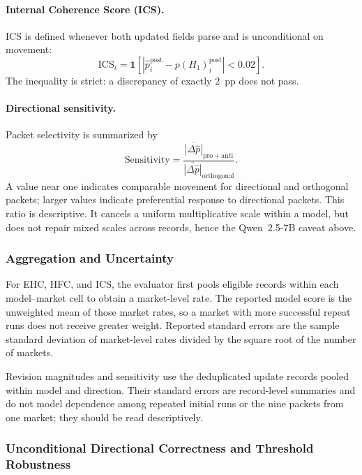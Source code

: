 \paragraph{Internal Coherence Score (ICS).}
ICS is defined whenever both updated fields parse and is unconditional on movement:
\begin{equation}
  \mathrm{ICS}_i=\mathbf{1}\!\left[
  \left|\hat p_i^{\mathrm{post}}-p(H_1)_i^{\mathrm{post}}\right|<0.02\right].
  \label{eq:ics}
\end{equation}
The inequality is strict: a discrepancy of exactly 2~pp does not pass.

\paragraph{Directional sensitivity.}
Packet selectivity is summarized by
\begin{equation}
  \mathrm{Sensitivity}=
  \frac{\overline{|\Delta\hat p|}_{\mathrm{pro}+\mathrm{anti}}}
       {\overline{|\Delta\hat p|}_{\mathrm{orthogonal}}}.
  \label{eq:sensitivity}
\end{equation}
A value near one indicates comparable movement for directional and orthogonal
packets; larger values indicate preferential response to directional packets. This
ratio is descriptive.  It cancels a uniform multiplicative scale within a model, but
does not repair mixed scales across records, hence the Qwen~2.5-7B caveat above.

\subsubsection{Aggregation and Uncertainty}
\label{app:aggregation}

For EHC, HFC, and ICS, the evaluator first pools eligible records within each
model--market cell to obtain a market-level rate.  The reported model score is the
unweighted mean of those market rates, so a market with more successful repeat runs
does not receive greater weight.  Reported standard errors are the sample standard
deviation of market-level rates divided by the square root of the number of markets.

Revision magnitudes and sensitivity use the deduplicated update records pooled
within model and direction. Their standard errors are record-level summaries and
do not model dependence among repeated initial runs or the nine packets from one
market; they should be read descriptively.

\subsubsection{Unconditional Directional Correctness and Threshold Robustness}
\label{app:exp1-threshold-robustness}

